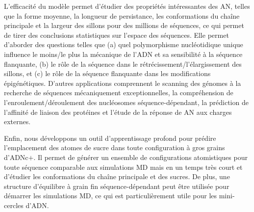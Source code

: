 L'efficacité du modèle permet d'étudier des propriétés intéressantes des AN, telles que la forme moyenne, la longueur de persistance, les conformations du  chaîne principale et la largeur des sillons pour des millions de séquences, ce qui permet de tirer des conclusions statistiques sur l'espace des séquences.
Elle permet d'aborder des questions telles que (a) quel polymorphisme nucléotidique unique influence le moins/le plus la mécanique de l'ADN et sa sensibilité à la séquence flanquante, (b) le rôle de la séquence dans le rétrécissement/l'élargissement des sillons, et (c) le rôle de la séquence flanquante dans les modifications épigénétiques.
D'autres applications comprennent le scanning des génomes à la recherche de séquences mécaniquement exceptionnelles, la compréhension de l'enroulement/déroulement des nucléosomes séquence-dépendant, la prédiction de l'affinité de liaison des protéines et l'étude de la réponse de AN aux charges externes.

Enfin, nous développons un outil d'apprentissage profond pour prédire l'emplacement des atomes de sucre dans toute configuration à gros grains d'ADNc$+$. Il permet de générer un ensemble de configurations atomistiques pour toute séquence comparable aux simulations MD mais en un temps très court et d'étudier les conformations du  chaîne principale et des sucres. De plus, une structure d'équilibre à grain fin séquence-dépendant peut être utilisée pour démarrer les simulations MD, ce qui est particulièrement utile pour les mini-cercles d'ADN.








